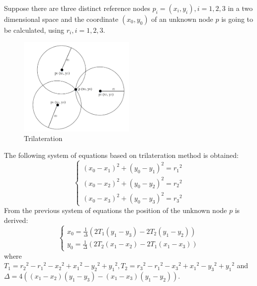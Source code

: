 Suppose there are three distinct reference nodes  $p_{i}=
\left ( x_{i},y_{i} \right ),i =1,2,3$ in a two dimensional space and the coordinate 
$\left ( x_{0},y_{0} \right ) $ of an unknown node $p$ is going to be calculated, using $r_{i},i =1,2,3$.

\begin{figure}[!htb]
  \centering
  \includegraphics[width=0.5\textwidth]{Figures/trilat.png}
  \caption[Trilateration]{Trilateration}
  \label{fig:trilaterationimag}
\end{figure}

The following system of equations based on trilateration method is obtained:
\begin{equation}
\begin{cases} 
\left (x_{0}-x_{1}\right )^{2}+
\left (  y_{0}-y_{1}\right )^{2}={r_{1}}^{2}\\
\left (x_{0}-x_{2}\right )^{2}+\left (  y_{0}-y_{2}\right )^{2}={r_{2}}^{2}\\
\left (x_{0}-x_{3}\right )^{2}+\left (  y_{0}-y_{3}\right )^{2}={r_{3}}^{2}
\end{cases}
\end{equation}
From the previous system of equations the position of the unknown node $p$ is derived:
\begin{equation}
\begin{cases} 
x_{0} =\frac{1}{\Delta}\left ( 2T_{1}\left ( y_{1}-y_{3} \right )-2T_{2}\left ( y_{1}-y_{2} \right ) \right )
\\y_{0} =\frac{1}{\Delta}\left ( 2T_{2}\left ( x_{1}-x_{2} \right )-2T_{1}\left ( x_{1}-x_{3} \right ) \right )
\end{cases}
\end{equation}
where $ T_{1} = {r_{2}}^{2}-{r_{1}}^{2}-{x_{2}}^{2}+{x_{1}}^{2}-{y_{2}}^{2}+{y_{1}}^{2}
, T_{2} = {r_{3}}^{2}-{r_{1}}^{2}-{x_{3}}^{2}+{x_{1}}^{2}-{y_{3}}^{2}+{y_{1}}^{2}
$ and 
$\Delta  = 4\left ( \left ( x_{1}-x_{2} \right ) \left ( y_{1}-y_{3} \right )-\left ( x_{1}-x_{3} \right )\left ( y_{1}-y_{2} \right )\right )$.

